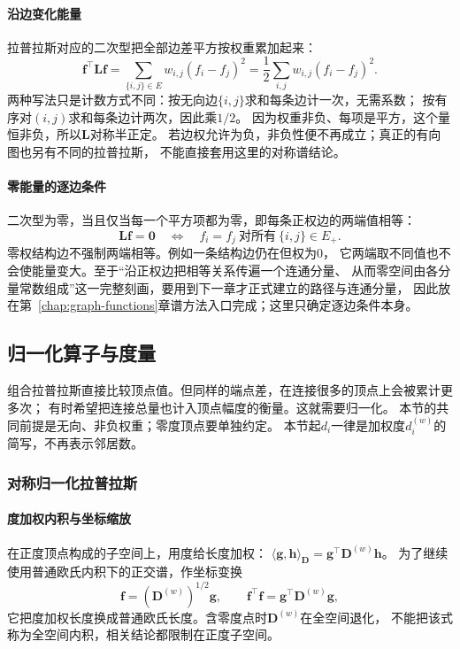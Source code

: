 \paragraph{沿边变化能量}
拉普拉斯对应的二次型把全部边差平方按权重累加起来：
\begin{equation}
  \bm f^\top\bm L\bm f
  =\sum_{\{i,j\}\in E}w_{i,j}(f_i-f_j)^2
  =\frac12\sum_{i,j}w_{i,j}(f_i-f_j)^2.
  \label{eq:graph-theory-dirichlet-energy}
\end{equation}
两种写法只是计数方式不同：按无向边$\{i,j\}$求和每条边计一次，无需系数；
按有序对$(i,j)$求和每条边计两次，因此乘$1/2$。
因为权重非负、每项是平方，这个量恒非负，所以$\bm L$对称半正定。
若边权允许为负，非负性便不再成立；真正的有向图也另有不同的拉普拉斯，
不能直接套用这里的对称谱结论。

\paragraph{零能量的逐边条件}
二次型为零，当且仅当每一个平方项都为零，即每条正权边的两端值相等：
\[
  \bm L\bm f=\bm 0
  \quad\Longleftrightarrow\quad
  f_i=f_j\ \text{对所有}\ \{i,j\}\in E_+.
\]
零权结构边不强制两端相等。例如一条结构边仍在但权为$0$，
它两端取不同值也不会使能量变大。至于“沿正权边把相等关系传遍一个连通分量、
从而零空间由各分量常数组成”这一完整刻画，要用到下一章才正式建立的路径与连通分量，
因此放在第~\ref{chap:graph-functions}章谱方法入口完成；这里只确定逐边条件本身。

\subsection{归一化算子与度量}

组合拉普拉斯直接比较顶点值。但同样的端点差，在连接很多的顶点上会被累计更多次；
有时希望把连接总量也计入顶点幅度的衡量。这就需要归一化。
本节的共同前提是无向、非负权重；零度顶点要单独约定。
本节起$d_i$一律是加权度$d_i^{(w)}$的简写，不再表示邻居数。

\subsubsection{对称归一化拉普拉斯}

\paragraph{度加权内积与坐标缩放}
在正度顶点构成的子空间上，用度给长度加权：
$\langle\bm g,\bm h\rangle_{\bm D}=\bm g^\top\bm D^{(w)}\bm h$。
为了继续使用普通欧氏内积下的正交谱，作坐标变换
\begin{equation}
  \bm f=(\bm D^{(w)})^{1/2}\bm g,\qquad
  \bm f^\top\bm f=\bm g^\top\bm D^{(w)}\bm g,
  \label{eq:graph-theory-degree-coordinates}
\end{equation}
它把度加权长度换成普通欧氏长度。含零度点时$\bm D^{(w)}$在全空间退化，
不能把该式称为全空间内积，相关结论都限制在正度子空间。


